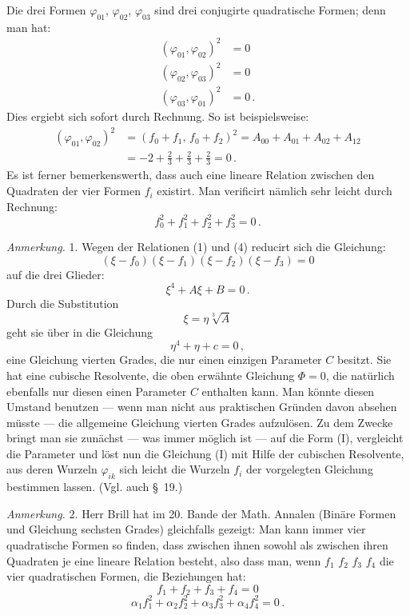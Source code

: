 \documentclass[11pt]{article}
\providecommand{\weberpage}[1]{}
\providecommand{\weq}[2]{\begin{equation}\tag{#1}#2\end{equation}}
\let\Phi\varPhi
\begin{document}
\weberpage{162}
Die drei Formen $\varphi_{01}$, $\varphi_{02}$, $\varphi_{03}$ sind drei conjugirte quadratische Formen; denn man hat:
\weq{3}{\begin{aligned}
(\varphi_{01},\varphi_{02})^2 &= 0\\
(\varphi_{02},\varphi_{03})^2 &= 0\\
(\varphi_{03},\varphi_{01})^2 &= 0\,.
\end{aligned}}
Dies ergiebt sich sofort durch Rechnung. So ist beispielsweise:
\[
\begin{aligned}
(\varphi_{01},\varphi_{02})^2 &= (f_0+f_1,\,f_0+f_2)^2 = A_{00}+A_{01}+A_{02}+A_{12}\\
&= -2 + \frac{2}{3} + \frac{2}{3} + \frac{2}{3} = 0\,.
\end{aligned}
\]
Es ist ferner bemerkenswerth, dass auch eine lineare Relation zwischen den Quadraten der vier Formen $f_i$ existirt. Man verificirt nämlich sehr leicht durch Rechnung:
\weq{4}{f_0^2+f_1^2+f_2^2+f_3^2=0\,.}

\textit{Anmerkung.} 1. Wegen der Relationen (1) und (4) reducirt sich die Gleichung:
\[
(\xi-f_0)(\xi-f_1)(\xi-f_2)(\xi-f_3)=0
\]
auf die drei Glieder:
\[
\xi^4+A\xi+B=0\,.
\]
Durch die Substitution
\[
\xi=\eta\sqrt[3]{A}
\]
geht sie über in die Gleichung
\weq{I}{\eta^4+\eta+c=0\,,}
eine Gleichung vierten Grades, die nur einen einzigen Parameter $C$ besitzt. Sie hat eine cubische Resolvente, die oben erwähnte Gleichung $\Phi=0$, die natürlich ebenfalls nur diesen einen Parameter $C$ enthalten kann. Man könnte diesen Umstand benutzen — wenn man nicht aus praktischen Gründen davon absehen müsste — die allgemeine Gleichung vierten Grades aufzulösen. Zu dem Zwecke bringt man sie zunächst — was immer möglich ist — auf die Form (I), vergleicht die Parameter und löst nun die Gleichung (I) mit Hilfe der cubischen Resolvente, aus deren Wurzeln $\varphi_{ik}$ sich leicht die Wurzeln $f_i$ der vorgelegten Gleichung bestimmen lassen. (Vgl. auch \S~19.)

\textit{Anmerkung.} 2. Herr Brill hat im 20. Bande der Math. Annalen (Binäre Formen und Gleichung sechsten Grades) gleichfalls gezeigt: Man kann immer vier quadratische Formen so finden, dass zwischen ihnen sowohl als zwischen ihren Quadraten je eine lineare Relation besteht, also dass man, wenn $f_1$ $f_2$ $f_3$ $f_4$ die vier quadratischen Formen, die Beziehungen hat:
\weq{1}{f_1+f_2+f_3+f_4=0}
\weq{2}{\alpha_1f_1^2+\alpha_2f_2^2+\alpha_3f_3^2+\alpha_4f_4^2=0\,.}
\end{document}
